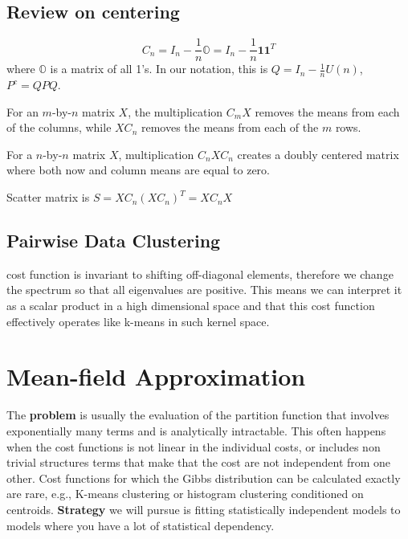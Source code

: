 \documentclass[12pt]{article}
\begin{document}
\subsection{Review on centering}
\[ C_n = I_n - \frac{1}{n}\mathbb{O} = I_n -\frac{1}{n}\mathbf{1}\mathbf{1}^T \]
where $\mathbb{O}$ is a matrix of all 1's. In our notation, this is $Q = I_n - \frac{1}{n}U(n)$, $P^c = QPQ$.
\par For an $m$-by-$n$ matrix $X$, the multiplication $C_m X$ removes the means from each of the columns, while $XC_n$ removes the means from each of the $m$ rows.
\par For a $n$-by-$n$ matrix $X$, multiplication $C_n X C_n$ creates a doubly centered matrix where both now and column means are equal to zero.
\par Scatter matrix is $S = XC_n (XC_n)^T = XC_n X$

\subsection{Pairwise Data Clustering}
\par cost function is invariant to shifting off-diagonal elements, therefore we change the spectrum so that all eigenvalues are positive. This means we can interpret it as a scalar product in a high dimensional space and that this cost function effectively operates like k-means in such kernel space.

\section{Mean-field Approximation}
\par The \textbf{problem} is usually the evaluation of the partition function that involves exponentially many terms and is analytically intractable. This often happens when the cost functions is not linear in the individual costs, or includes non trivial structures terms that make that the cost are not independent from one other. Cost functions for which the Gibbs distribution can be calculated exactly are rare, e.g., K-means clustering or histogram clustering conditioned on centroids. \textbf{Strategy} we will pursue is fitting statistically independent models to models where you have a lot of statistical dependency.
\end{document}
